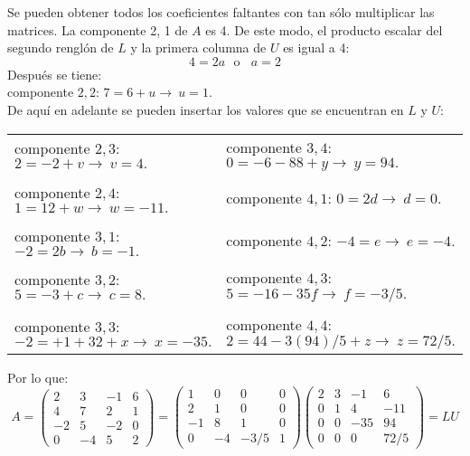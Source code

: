 \documentclass[11pt,letterpaper]{article}
\begin{document}
\begin{enumerate}
Se pueden obtener todos los coeficientes faltantes con tan sólo multiplicar las matrices. La
componente 2, 1 de $A$ es 4. De este modo, el producto escalar del segundo renglón de $L$ y la primera columna de $U$ es igual a 4:
$$4=2a \ \ \ \text{o}  \ \ \ \ a=2$$
Después se tiene:\\
componente $2,2$: $7=6+u \rightarrow \ u=1.$\\
De aquí en adelante se pueden insertar los valores que se encuentran en $L$ y $U$:
\begin{table}[H]
\centering
\begin{tabular}{l|l}
componente $2,3$: $2=-2+v \rightarrow \ v=4.$ & componente $3,4$: $0=-6-88+y \rightarrow \ y=94.$\\ \\
componente $2,4$: $1=12+w \rightarrow \ w=-11.$ & componente $4,1$: $0=2d \rightarrow \ d=0.$\\ \\
componente $3,1$: $-2=2b \rightarrow \ b=-1.$ & componente $4,2$: $-4=e \rightarrow \ e=-4.$\\ \\
componente $3,2$: $5=-3+c \rightarrow \ c=8.$ & componente $4,3$: $5=-16-35f \rightarrow \ f=-3/5.$\\ \\
componente $3,3$: $-2=+1+32+x \rightarrow \ x=-35.$ & componente $4,4$: $2=44-3(94)/5+z \rightarrow \ z=72/5.$\\ 
\end{tabular}
\end{table}
Por lo que:
\begin{equation*}
A=\left(\begin{array}{rrrr}
 2 &  3 & -1 & 6\\
 4 &  7 &  2 & 1\\
-2 &  5 & -2 & 0\\
 0 & -4 &  5 & 2
\end{array} \right) =
\left(\begin{array}{rrrr}
 1 &  0 &  0 & 0\\
 2 &  1 &  0 & 0\\
-1 &  8 &  1 & 0\\
 0 &  -4 & -3/5 & 1
\end{array} \right) \left(\begin{array}{rrrr}
 2 &  3 & -1 & 6\\
 0 &  1 &  4 & -11\\
 0 &  0 &  -35 & 94\\
 0 &  0 &  0 & 72/5
\end{array} \right)=LU

\end{equation*}
\end{enumerate}
\end{document}
